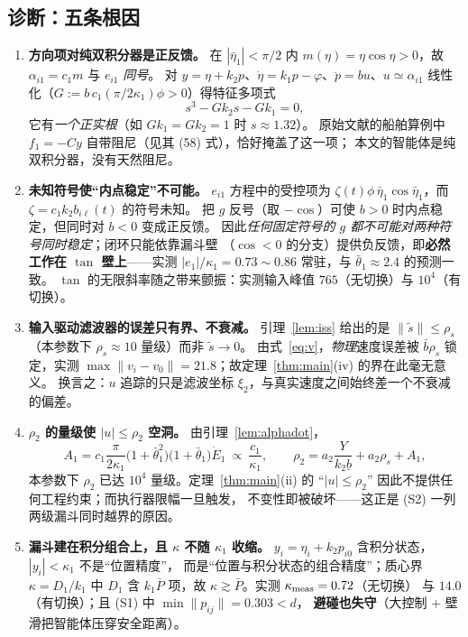 \documentclass[11pt,a4paper]{article}
\newcommand{\ub}{\underline{b}}
\theoremstyle{plain}
\theoremstyle{definition}
\theoremstyle{remark}
\begin{document}
\subsection{诊断：五条根因}
\begin{enumerate}[label=(D\arabic*)]
\item \textbf{方向项对纯双积分器是正反馈。} 在 $|\bar\eta_1|<\pi/2$ 内
$m(\eta)=\eta\cos\eta>0$，故 $\alpha_{i1}=c_1m$ 与 $e_{i1}$ \emph{同号}。
对 $y=\eta+k_2p$、$\dot\eta=k_1p-\varphi$、$\ddot p=b u$、$u\simeq\alpha_{i1}$
线性化（$G:=b\,c_1(\pi/2\kappa_1)\phi>0$）得特征多项式
\begin{equation*}
s^3-Gk_2s-Gk_1=0,
\end{equation*}
它有\emph{一个正实根}（如 $Gk_1=Gk_2=1$ 时 $s\approx1.32$）。
原始文献的船舶算例中 $f_1=-Cy$ 自带阻尼（见其 (58) 式），恰好掩盖了这一项；
本文的智能体是纯双积分器，没有天然阻尼。

\item \textbf{未知符号使“内点稳定”不可能。} $e_{i1}$ 方程中的受控项为
$\zeta(t)\phi\,\bar\eta_1\cos\bar\eta_1$，而 $\zeta=c_1k_2b_{i\ell}(t)$ 的符号未知。
把 $g$ 反号（取 $-\cos$）可使 $b>0$ 时内点稳定，但同时对 $b<0$ 变成正反馈。
因此\emph{任何固定符号的 $g$ 都不可能对两种符号同时稳定}；闭环只能依靠漏斗壁
（$\cos<0$ 的分支）提供负反馈，即\textbf{必然工作在 $\tan$ 壁上}——实测
$|e_1|/\kappa_1=0.73\sim0.86$ 常驻，与 $\bar\theta_1\approx2.4$ 的预测一致。
$\tan$ 的无限斜率随之带来颤振：实测输入峰值 $765$（无切换）与 $10^4$（有切换）。

\item \textbf{输入驱动滤波器的误差只有界、不衰减。} 引理~\ref{lem:iss} 给出的是
$\|\tilde s\|\le\rho_s$（本参数下 $\rho_s\approx10$ 量级）而非 $\tilde s\to0$。
由式~\eqref{eq:v}，\emph{物理}速度误差被 $\bar b\rho_s$ 锁定，实测
$\max\|v_i-v_0\|=21.8$；故定理~\ref{thm:main}(iv) 的界在此毫无意义。
换言之：$u$ 追踪的只是滤波坐标 $\xi_2$，与真实速度之间始终差一个不衰减的偏差。

\item \textbf{$\rho_2$ 的量级使 $|u|\le\rho_2$ 空洞。} 由引理~\ref{lem:alphadot}，
\begin{equation*}
A_1=c_1\frac{\pi}{2\kappa_1}\bigl(1+\bar\theta_1^2\bigr)\bigl(1+\bar\theta_1\bigr)\dot E_1
\ \propto\ \frac{c_1}{\kappa_1},
\qquad
\rho_2=a_2\frac{Y}{k_2\ub}+a_2\rho_s+A_1,
\end{equation*}
本参数下 $\rho_2$ 已达 $10^4$ 量级。定理~\ref{thm:main}(ii) 的
“$|u|\le\rho_2$” 因此不提供任何工程约束；而执行器限幅一旦触发，
不变性即被破坏——这正是 (S2) 一列两级漏斗同时越界的原因。

\item \textbf{漏斗建在积分组合上，且 $\kappa$ 不随 $\kappa_1$ 收缩。}
$y_i=\eta_i+k_2p_{i0}$ 含积分状态，$|y_i|<\kappa_1$ 不是“位置精度”，
而是“位置与积分状态的组合精度”；质心界 $\kappa=D_1/k_1$ 中 $D_1$ 含
$k_1\bar P$ 项，故 $\kappa\gtrsim\bar P$。实测 $\kappa_{\rm meas}=0.72$（无切换）
与 $14.0$（有切换）；且 (S1) 中 $\min\|p_{ij}\|=0.303<d$，
\textbf{避碰也失守}（大控制 + 壁滑把智能体压穿安全距离）。
\end{enumerate}
\end{document}
